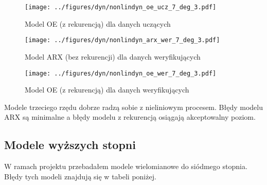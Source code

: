 \documentclass[a4paper,titlepage,11pt,floatssmall]{mwrep}
\begin{document}
\begin{figure}[H]
\centering
\texttt{[image: ../figures/dyn/nonlindyn\_oe\_ucz\_7\_deg\_3.pdf]}
\caption{Model OE (z rekurencją) dla danych uczących}
\end{figure}

\begin{figure}[H]
\centering
\texttt{[image: ../figures/dyn/nonlindyn\_arx\_wer\_7\_deg\_3.pdf]}
\caption{Model ARX (bez rekurencji) dla danych weryfikujących}
\end{figure}

\begin{figure}[H]
\centering
\texttt{[image: ../figures/dyn/nonlindyn\_oe\_wer\_7\_deg\_3.pdf]}
\caption{Model OE (z rekurencją) dla danych weryfikujących}
\end{figure}

Modele trzeciego rzędu dobrze radzą sobie z nieliniowym procesem. Błędy modelu ARX są minimalne a błędy modelu z rekurencją osiągają akceptowalny poziom.
\newpage
\subsection{Modele wyższych stopni}

W ramach projektu przebadałem modele wielomianowe do siódmego stopnia. Błędy tych modeli znajdują się w tabeli poniżej.
\end{document}
